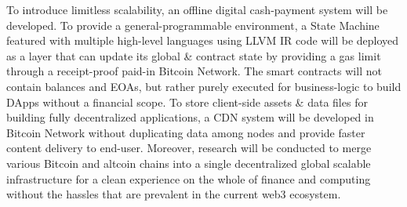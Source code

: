 \documentclass[a4paper,	10pt]{extarticle}
\begin{document}
To introduce limitless scalability, an offline digital cash-payment system will be developed. To provide a general-programmable environment, a State Machine \cite{wood2014ethereum} featured with multiple high-level languages using LLVM \cite{llvm} IR code will be deployed as a layer that can update its global \& contract state by providing a gas limit through a receipt-proof paid-in Bitcoin Network. The smart contracts will not contain balances and EOAs, but rather purely executed for business-logic to build DApps without a financial scope. To store client-side assets \& data files for building fully decentralized applications, a CDN system will be developed in Bitcoin Network without duplicating data among nodes and provide faster content delivery to end-user. Moreover, research will be conducted to merge various Bitcoin and altcoin chains into a single decentralized global scalable infrastructure for a clean experience on the whole of finance and computing without the hassles that are prevalent in the current web3 ecosystem.




\end{document}
